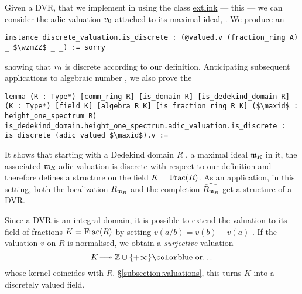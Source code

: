 \documentclass[sigplan,10pt,anonymous,review]{acmart}
\begin{document}
Given a DVR, that we implement in \lean using the \mathlib class \href{https://leanprover-community.github.io/mathlib_docs/ring_theory/discrete_valuation_ring/basic.html#discrete_valuation_ring}{extlink} --- this  --- we can consider the adic valuation ${v}_{0}$ attached to its maximal ideal, . We produce an 
\begin{lstlisting}
instance discrete_valuation.is_discrete : (@valued.v (fraction_ring A) _ $\wzmZZ$ _ _) := sorry
\end{lstlisting}
showing that ${v}_{0}$ is discrete according to our definition. Anticipating subsequent applications to algebraic number , we also prove the 
\begin{lstlisting}
lemma (R : Type*) [comm_ring R] [is_domain R] [is_dedekind_domain R] (K : Type*) [field K] [algebra R K] [is_fraction_ring R K] ($\maxid$ : height_one_spectrum R) is_dedekind_domain.height_one_spectrum.adic_valuation.is_discrete : is_discrete (adic_valued $\maxid$).v := 
\end{lstlisting}
It shows that starting with a Dedekind domain $R$ , a maximal ideal $\mathfrak{m}_{R}$ in it, the associated $\mathfrak{m}_{R}$-adic valuation is discrete with respect to our definition and therefore defines a  structure on the field $K=\operatorname{Frac}(R)$. {As an application, in this setting, both the localization $R_{\mathfrak{m}_{R}}$ and the completion $\widehat{R_{\mathfrak{m}_{R}}}$ get a structure of a DVR}.

Since a DVR is an integral domain, it is possible to extend the valuation to its field of fractions $K=\operatorname{Frac}(R)$ by setting $v(a/b)=v(b)-v(a)$ . If the valuation $v$ on $R$ is normalised, we obtain a \emph{surjective} valuation
\[
K\longtwoheadrightarrow \ZZ\cup\{+\infty\}\text{\fil{or\dots}}
\]
whose kernel coincides with $\unit{R}$.  \S\ref{subsection:valuations}, this turns $K$ into a discretely valued field. 

\end{document}
